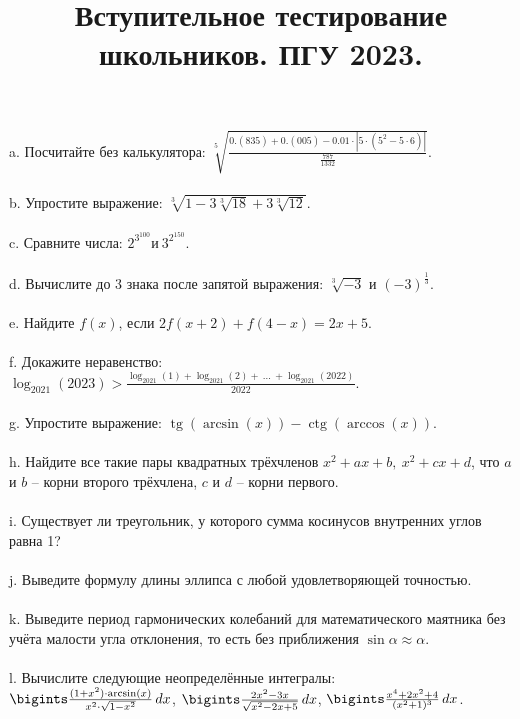 \documentclass[a4paper,12pt]{article}
\date{}
\title{Вступительное тестирование школьников. ПГУ 2023.}
\DeclareMathOperator{\log}{log}
\DeclareMathOperator{\tg}{tg}
\DeclareMathOperator{\arcsin}{arcsin}
\DeclareMathOperator{\ctg}{ctg}
\DeclareMathOperator{\arccos}{arccos}
\begin{document}
\maketitle
\thispagestyle{empty}
\large{
\noindent
a. Посчитайте без калькулятора: $\sqrt[5]{\frac{0.(835) + 0.(005) - 0.01\cdot|5\cdot(5^2-5\cdot 6)|}{\frac{787}{1332}}}$.\\\\
b. Упростите выражение:
$\sqrt[3]{1-3\sqrt[3]{18}+3\sqrt[3]{12}}$.\\\\
c. Сравните числа: $2^{3^{100}} \text{и}\  3^{2^{150}}$.\\\\
d. Вычислите до 3 знака после запятой выражения: $\sqrt[3]{-3}$ и $(-3)^\frac{1}{3}$.\\\\
e. Найдите $f(x)$, если $2f(x+2)+f(4-x) = 2x+5.$\\\\
f. Докажите неравенство: $\log_{2021}(2023) > \frac{\log_{2021}(1) + \log_{2021}(2)+\ \dotsc \ +\log_{2021}(2022)}{2022}$.\\\\
g. Упростите выражение: $\tg(\arcsin(x)) - \ctg(\arccos(x))$.\\\\
h. Найдите все такие пары квадратных трёхчленов $x^2+ax+b,\ x^2+cx+d$, что $a$ и $b$ -- корни второго трёхчлена, $c$ и $d$ -- корни первого.\\\\
i. Существует ли треугольник, у которого сумма косинусов внутренних углов равна 1?\\\\
j. Выведите формулу длины эллипса с любой удовлетворяющей точностью.\\\\
k. Выведите период гармонических колебаний для математического маятника без учёта малости угла отклонения, то есть без приближения $\sin{\alpha} \approx \alpha$.\\\\
l. Вычислите следующие неопределённые интегралы:\\
$\bigints\frac{(1+x^2)\cdot \arcsin(x)}{x^2\cdot \sqrt{1-x^2}} \,dx$, $\bigints \frac{2x^2-3x}{\sqrt{x^2-2x+5}} \,dx$, $\bigints \frac{x^4+2x^2+4}{(x^2+1)^3} \,dx$.
}
\end{document}
